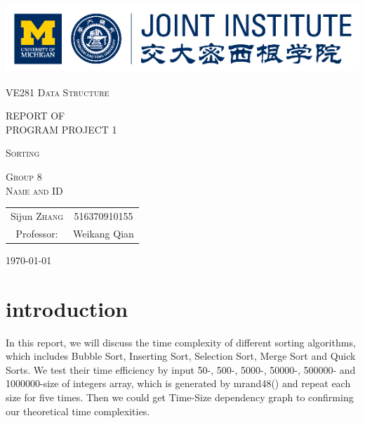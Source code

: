 \documentclass{article}
\begin{document}
\begin{titlepage}

\begin{center}

\includegraphics[height=1.0in]{logo}

{
\vspace{0.8cm}
\Large
\textsc{VE281 Data Structure} \\[0.5cm]
}



{
\Huge
\textsc{REPORT OF\\ PROGRAM PROJECT 1} \\[0.2cm]
}

{
\vspace{0.01cm}
\middle
\textsc{Sorting}\\[0.8cm]
}

{
\large

\textsc{Group 8}\\[2.6cm]
\textsc{Name and ID}\\[0.3cm]

\begin{tabular}{cc}

Sijun \textsc{Zhang} & 516370910155 \\ [4cm]%



Professor: & Weikang Qian \\
\end{tabular}
}

\vspace{1.0cm}

{\large \today}\\

\end{center}

\end{titlepage}

\section{introduction}
In this report, we will discuss the time complexity of different sorting algorithms, which includes Bubble Sort, Inserting Sort, Selection Sort, Merge Sort and Quick Sorts. We test their time efficiency by input 50-, 500-, 5000-, 50000-, 500000- and 1000000-size of integers array, which is generated by mrand48() and repeat each size for five times. Then we could get Time-Size dependency graph to confirming our theoretical time complexities.
\end{document}
